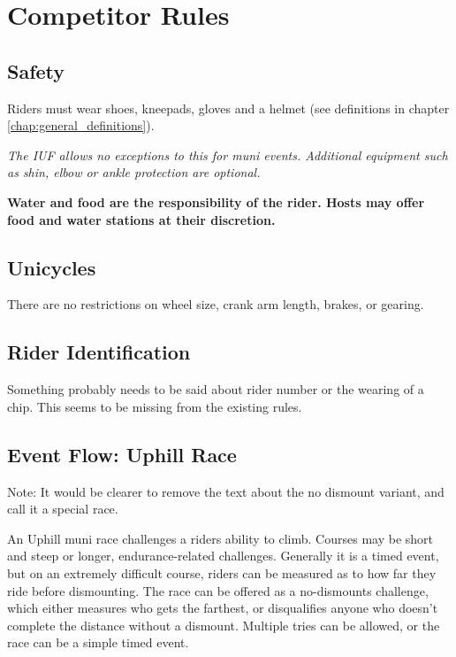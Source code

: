 \chapter{Competitor Rules}

\section{Safety}
Riders must wear shoes, kneepads, gloves and a helmet (see definitions in chapter \ref{chap:general_definitions}).

\textit{The IUF allows no exceptions to this for muni events. Additional equipment such as shin, elbow or ankle protection are optional.}

\textbf{Water and food are the responsibility of the rider. Hosts may offer food and water stations at their discretion.}

\section{Unicycles}

There are no restrictions on wheel size, crank arm length, brakes, or gearing.

\section{Rider Identification}

\begin{framed}
Something probably needs to be said about rider number or the wearing of a chip.  This seems to be missing from the existing rules.
\end{framed}

\section{Event Flow: Uphill Race \label{sec:muni_uphill}}

\begin{framed}
Note: It would be clearer to remove the text about the no dismount variant, and call it a special race.
\end{framed}

An Uphill muni race challenges a riders ability to climb.
Courses may be short and steep or longer, endurance-related challenges. 
Generally it is a timed event, but on an extremely difficult course, riders can be measured as to how far they ride before dismounting.
The race can be offered as a no-dismounts challenge, which either measures who gets the farthest, or disqualifies anyone who doesn't complete the distance without a dismount.
Multiple tries can be allowed, or the race can be a simple timed event.

